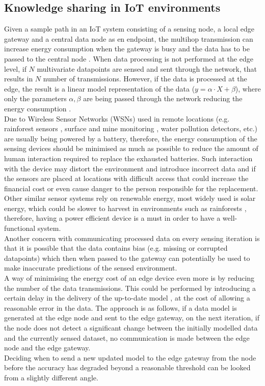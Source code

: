 \documentclass{mpaper}
\begin{document}
\subsection*{Knowledge sharing in IoT environments}
Given a sample path in an IoT system consisting of a sensing node, a local edge gateway and a central data node as en endpoint, the multihop transmission can increase energy consumption when the gateway is busy and the data has to be passed to the central node \cite{shi2016}. When data processing is not performed at the edge level, if $N$ multivariate datapoints are sensed and sent through the network, that results in $N$ number of transmissions. However, if the data is processed at the edge, the result is a linear model representation of the data ($y = \alpha\cdot X + \beta$), where only the parameters $\alpha, \beta$ are being passed through the network reducing the energy consumption \cite{tanluizhang2011}.\\
Due to Wireless Sensor Networks (WSNs) used in remote locations (e.g. rainforest sensors  \cite{rainforests2009}, surface and mine monitoring \cite{Akkas2018}, water pollution detectors\cite{waterwsn2017}, etc.) are usually being powered by a battery, therefore, the energy consumption of the sensing devices should be minimised as much as possible to reduce the amount of human interaction required to replace the exhausted batteries. Such interaction with the device may distort the environment and introduce incorrect data and if the sensors are placed at locations with difficult access that could increase the financial cost or even cause danger to the person responsible for the replacement.\\
Other similar sensor systems rely on renewable energy, most widely used is solar energy, which could be slower to harvest in environments such as rainforests \cite{rainforests2009}, therefore, having a power efficient device is a must in order to have a well-functional system.\\
Another concern with communicating processed data on every sensing iteration is that it is possible that the data contains bias (e.g. missing or corrupted datapoints) \cite{anagnostop2016} which then when passed to the gateway can potentially be used to make inaccurate predictions of the sensed environment.\\
A way of minimising the energy cost of an edge device even more is by reducing the number of the data transmissions. This could be performed by introducing a certain delay in the delivery of the up-to-date model \citep{anagnostop2014, anagnostop2016, anagnostopkolomvatos2016}, at the cost of allowing a reasonable error in the data. 
The approach is as follows, if a data model is generated at the edge node and sent to the edge gateway, on the next iteration, if the node does not detect a significant change between the initially modelled data and the currently sensed dataset, no communication is made between the edge node and the edge gateway.\\
Deciding when to send a new updated model to the edge gateway from the node before the accuracy has degraded beyond a reasonable threshold can be looked from a slightly different angle. 
\end{document}
